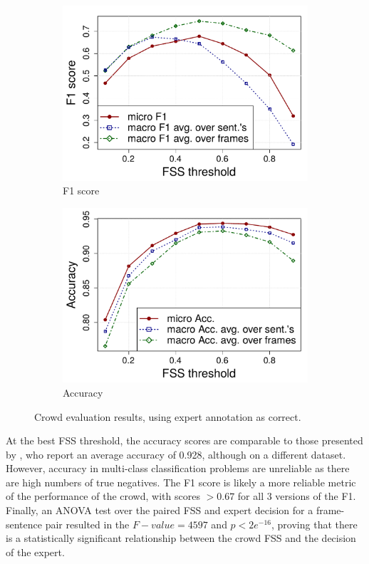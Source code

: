 \begin{figure}[tbh!]
\centering
\begin{subfigure}{.5\textwidth}
\centering
\includegraphics[width=\linewidth]{img/sent_f1_micro_macro.pdf}
\caption{F1 score}
\label{fig:sent_f1}
\end{subfigure}%
\begin{subfigure}{.5\textwidth}
\centering
\includegraphics[width=\linewidth]{img/sent_acc_micro_macro.pdf}
\caption{Accuracy}
\label{fig:sent_acc}
\end{subfigure}
\caption{Crowd evaluation results, using expert annotation as correct.}
\end{figure}

At the best FSS threshold, the accuracy scores are comparable to those presented by \citet{Hong:2011:GCR:2018966.2018970}, who report an average accuracy of 0.928, although on a different dataset. However, accuracy in multi-class classification problems are unreliable as there are high numbers of true negatives. The F1 score is likely a more reliable metric of the performance of the crowd, with scores $ > 0.67 $ for all 3 versions of the F1. Finally, an ANOVA test over the paired FSS and expert decision for a frame-sentence pair resulted in the $ F-value = 4597 $ and $p < 2e^{-16} $, proving that there is a statistically significant relationship between the crowd FSS and the decision of the expert.

